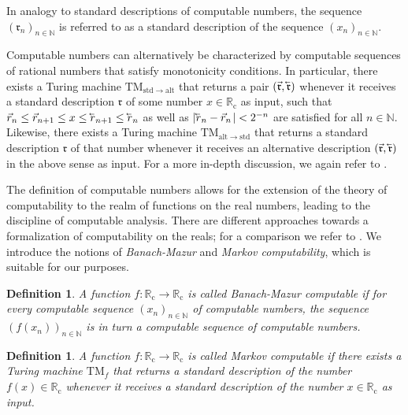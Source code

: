 \documentclass[conference]{IEEEtran}
\def\NN{{\mathbb N}}
\def\RR{{\mathbb R}}
\newcommand{\RRc}{\RR_{\mathrm{c}}}
\newcommand{\TM}{\mathrm{TM}}
\newcommand{\cev}[1]{\reflectbox{\ensuremath{\vec{\reflectbox{\ensuremath{#1}}}}}}
\newtheorem{Definition}[Theorem]{Definition}
\begin{document}
	In analogy to standard descriptions of computable numbers, the sequence \((\mathfrak{r}_n)_{n\in\NN}\) is referred to as a standard description
	of the sequence \((x_n)_{n\in\NN}\).

	Computable numbers can alternatively be characterized by computable sequences of rational numbers that satisfy monotonicity conditions. 
	In particular, there exists a Turing machine \(\TM_{\mathrm{std}\rightarrow\mathrm{alt}}\) that returns a pair \((\vec{\mathfrak{r}}, \cev{\mathfrak{r}})\) 
	whenever it receives a standard description \(\mathfrak{r}\) of some number \(x\in\RRc\) as input, such that
	\(	\vec{r}_n \leq \vec{r}_{n+1} \leq x \leq \cev{r}_{n+1} \leq \cev{r}_n
	\)
	as well as 
	\(	| \cev{r}_n - \vec{r}_n\hspace{1pt}| < 2^{-n}
	\)
	are satisfied for all \(n\in\NN\). Likewise, there exists a Turing machine \(\TM_{\mathrm{alt}\rightarrow\mathrm{std}}\) that returns a standard description 
	\(\mathfrak{r}\) of that number whenever it receives an alternative description \((\vec{\mathfrak{r}}, \cev{\mathfrak{r}})\) in the above sense as input. 
	For a more in-depth discussion, we again refer to \cite{PoRi17}. %

	The definition of computable numbers allows for the extension of the theory of computability to the realm of functions on the real numbers, 
	leading to the discipline of computable analysis. There are different approaches towards a formalization of computability on the reals; for a comparison 
	we refer to \cite{AB14}. We introduce the notions of \emph{Banach-Mazur} and \emph{Markov computability}, which is suitable for our purposes. 

	\begin{Definition}  \label{Borel}
						A function \(f : \RRc \to \RRc\) is called Banach-Mazur computable %
						if for every computable sequence \((x_n)_{n\in\NN}\) of computable numbers, the sequence
						\((f(x_n))_{n\in\NN}\) is in turn a computable sequence of computable numbers.
	\end{Definition}
	
	\begin{Definition}  \label{Borel}
						A function \(f : \RRc \to \RRc\) is called Markov computable %
						if there exists a Turing machine \(\TM_f\) that returns a standard description
						of the number \(f(x) \in \RRc\) whenever it receives a standard description of the number \(x\in \RRc\) as input.
	\end{Definition}
	
\end{document}
